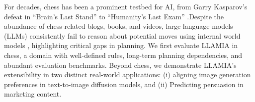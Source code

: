 \documentclass{article}
\theoremstyle{plain}
\theoremstyle{definition}
\theoremstyle{remark}
\begin{document}

For decades, chess has been a prominent testbed for AI, from Garry Kasparov's defeat in ``Brain's Last Stand'' \cite{campbell2002deep} to ``Humanity's Last Exam'' \cite{phan2025humanitysexam}.Despite the abundance of chess-related blogs, books, and videos, large language models (LLMs) consistently fail to reason about potential moves using internal world models \cite{schultz2024mastering}, highlighting critical gaps in planning. We first evaluate LLAMIA in chess, a domain with well-defined rules, long-term planning dependencies, and abundant evaluation benchmarks. Beyond chess, we demonstrate LLAMIA’s extensibility in two distinct real-world applications: (i) aligning image generation preferences in text-to-image diffusion models, and (ii) Predicting persuasion in marketing content.
\end{document}
